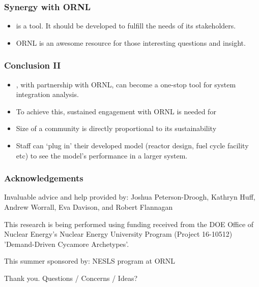 \begin{frame}
	\frametitle{Synergy with ORNL}
	\begin{itemize}
		\item \Cyclus is a tool. It should be developed to fulfill the needs of its stakeholders.
		\item ORNL is an awesome resource for those interesting questions and insight.
	\end{itemize}
\end{frame}


\begin{frame}
	\frametitle{Conclusion II}
	\begin{itemize}
		\item \Cyclus, with partnership with ORNL, can become a one-stop tool for system integration analysis.
        \item To achieve this, sustained engagement with ORNL is needed for \Cyclus
        \item Size of a community is directly proportional to its sustainability
		\item Staff can `plug in' their developed model (reactor design, fuel cycle facility etc) to see the model's performance in a larger system.
	\end{itemize}
\end{frame}




\begin{frame}
    \frametitle{Acknowledgements}
    Invaluable advice and help provided by:
    Joshua Peterson-Droogh, Kathryn Huff, Andrew Worrall, Eva Davison, and Robert Flannagan

    This research is being performed using funding received from the DOE Office of Nuclear Energy's Nuclear Energy University Program (Project 16-10512) 'Demand-Driven Cycamore Archetypes'.

    This summer sponsored by:
    NESLS program at ORNL

\end{frame}

\begin{frame}
    Thank you. Questions / Concerns / Ideas?
\end{frame}